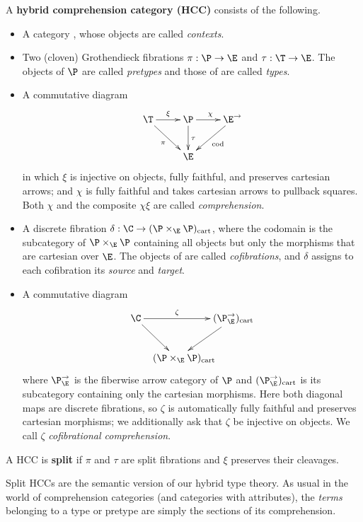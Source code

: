 \documentclass{amsart}
\begin{document}
\begin{defn}
  A \textbf{hybrid comprehension category (HCC)} consists of the following.
  \begin{itemize}
  \item A category \E, whose objects are called \emph{contexts}.
  \item Two (cloven) Grothendieck fibrations $\pi:\P\to\E$ and $\tau:\T\to\E$.
    The objects of $\P$ are called \emph{pretypes} and those of \T are called \emph{types}.
  \item A commutative diagram
    \begin{equation*}
      \vcenter{\xymatrix{
          \T \ar[dr]_\pi \ar[r]^\xi &
          \P \ar[d]^\tau \ar[r]^\chi &
          \E^\to \ar[dl]^{\mathrm{cod}} \\
          & \E
        }}
    \end{equation*}
    in which $\xi$ is injective on objects, fully faithful, and preserves cartesian arrows; and $\chi$ is fully faithful and takes cartesian arrows to pullback squares.
    Both $\chi$ and the composite $\chi\xi$ are called \emph{comprehension}.
  \item A discrete fibration $\delta : \C \to (\P \times_{\E} \P)_{\mathrm{cart}}$, where the codomain is the subcategory of $\P \times_{\E} \P$ containing all objects but only the morphisms that are cartesian over $\E$.  The objects of \C are called \emph{cofibrations}, and $\delta$ assigns to each cofibration its \emph{source} and \emph{target}.
  \item A commutative diagram
    \[ \xymatrix@C=.5pc{ \C \ar[rr]^-\zeta \ar[dr] && (\P^\to_\E)_{\mathrm{cart}} \ar[dl]\\
      & (\P \times_{\E} \P)\mathrlap{_{\mathrm{cart}}} } \]
    where $\P^\to_\E$ is the fiberwise arrow category of $\P$ and $(\P^\to_\E)_{\mathrm{cart}}$ is its subcategory containing only the cartesian morphisms.
    Here both diagonal maps are discrete fibrations, so $\zeta$ is automatically fully faithful and preserves cartesian morphisms; we additionally ask that $\zeta$ be injective on objects.
    We call $\zeta$ \emph{cofibrational comprehension}.
  \end{itemize}
  A HCC is \textbf{split} if $\pi$ and $\tau$ are split fibrations and $\xi$ preserves their cleavages.
\end{defn}

Split HCCs are the semantic version of our hybrid type theory.
As usual in the world of comprehension categories (and categories with attributes), the \emph{terms} belonging to a type or pretype are simply the sections of its comprehension.
\end{document}

